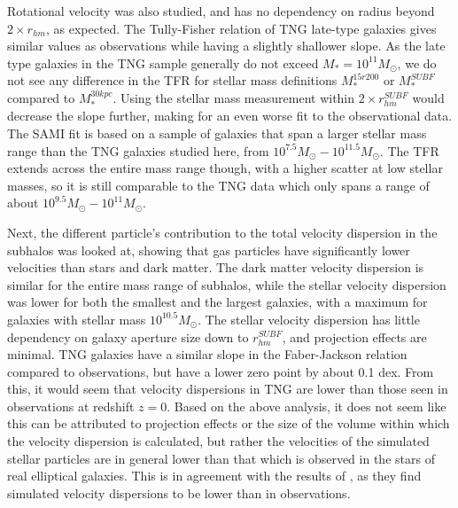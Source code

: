 Rotational velocity was also studied, and has no dependency on radius beyond $2 \times r_{hm}$, as expected. The Tully-Fisher relation of TNG late-type galaxies gives similar values as observations while having a slightly shallower slope. As the late type galaxies in the TNG sample generally do not exceed $M_\ast = 10^{11} M_{\odot}$, we do not see any difference in the TFR for stellar mass definitions $M_\ast^{15r200}$ or $M_\ast^{SUBF}$ compared to $M_\ast^{30kpc}$. Using the stellar mass measurement within $2 \times r_{hm}^{SUBF}$ would decrease the slope further, making for an even worse fit to the observational data. The SAMI fit is based on a sample of galaxies that span a larger stellar mass range than the TNG galaxies studied here, from $10^{7.5} M_{\odot} - 10^{11.5} M_{\odot}$. The TFR extends across the entire mass range though, with a higher scatter at low stellar masses, so it is still comparable to the TNG data which only spans a range of about $10^{9.5} M_{\odot} - 10^{11} M_{\odot}$. 


Next, the different particle's contribution to the total velocity dispersion in the subhalos was looked at, showing that gas particles have significantly lower velocities than stars and dark matter. The dark matter velocity dispersion is similar for the entire mass range of subhalos, while the stellar velocity dispersion was lower for both the smallest and the largest galaxies, with a maximum for galaxies with stellar mass $10^{10.5} M_\odot$. The stellar velocity dispersion has little dependency on galaxy aperture size down to $r^{SUBF}_{hm}$, and projection effects are minimal. TNG galaxies have a similar slope in the Faber-Jackson relation compared to observations, but have a lower zero point by about 0.1 dex.  From this, it would seem that velocity dispersions in TNG are lower than those seen in observations at redshift $z=0$. Based on the above analysis, it does not seem like this can be attributed to projection effects or the size of the volume within which the velocity dispersion is calculated, but rather the velocities of the simulated stellar particles are in general lower than that which is observed in the stars of real elliptical galaxies. This is in agreement with the results of \textcite{Sande2018}, as they find simulated velocity dispersions to be lower than in observations. 


